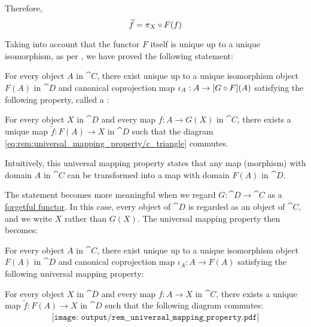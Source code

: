 \begin{remark}
  Therefore,
  \begin{equation*}
    \widetilde{f} = \pi_X \bincirc F(f)
  \end{equation*}

  Taking into account that the functor \( F \) itself is unique up to a unique isomorphism, as per , we have proved the following statement:
  \begin{displayquote}
    For every object \( A \) in \( \cat{C} \), there exist unique up to a unique isomorphism object \( F(A) \) in \( \cat{D} \) and canonical coprojection map \( \iota_A: A \to [G \bincirc F](A) \) satisfying the following property, called a :
    \begin{displayquote}
      For every object \( X \) in \( \cat{D} \) and every map \( f: A \to G(X) \) in \( \cat{C} \), there exists a unique map \( \widetilde{f}: F(A) \to X \) in \( \cat{D} \) such that the diagram \eqref{eq:rem:universal_mapping_property/c_triangle} commutes.
    \end{displayquote}
  \end{displayquote}

  Intuitively, this universal mapping property states that any map (morphism) with domain \( A \) in \( \cat{C} \) can be transformed into a map with domain \( F(A) \) in \( \cat{D} \).

  The statement becomes more meaningful when we regard \( G: \cat{D} \to \cat{C} \) as a \hyperref[def:concrete_category]{forgetful functor}. In this case, every object of \( \cat{D} \) is regarded as an object of \( \cat{C} \), and we write \( X \) rather than \( G(X) \). The universal mapping property then becomes:
  \begin{displayquote}
    For every object \( A \) in \( \cat{C} \), there exist unique up to a unique isomorphism object \( F(A) \) in \( \cat{D} \) and canonical coprojection map \( \iota_A: A \to F(A) \) satisfying the following universal mapping property:
    \begin{displayquote}
      For every object \( X \) in \( \cat{D} \) and every map \( f: A \to X \) in \( \cat{C} \), there exists a unique map \( \widetilde{f}: F(A) \to X \) in \( \cat{D} \) such that the following diagram commutes:
      \begin{equation}\label{eq:rem:universal_mapping_property/c_triangle_forgetful}
        \begin{aligned}
          \texttt{[image: output/rem\_\_universal\_mapping\_property.pdf]}
        \end{aligned}
      \end{equation}
    \end{displayquote}
  \end{displayquote}


\end{remark}
